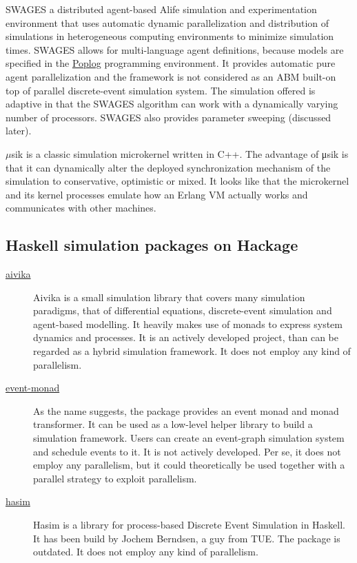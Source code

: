\documentclass[a4paper]{article}
\begin{document}
SWAGES\cite{scheutz_swages-extendable_2006} a distributed agent-based Alife simulation and experimentation environment that uses automatic
dynamic parallelization and distribution of simulations in heterogeneous computing environments to minimize simulation times. SWAGES allows for multi-language agent definitions, because models
are specified in the \href{http://en.wikipedia.org/wiki/Poplog}{Poplog} programming environment. It provides automatic pure agent parallelization and the framework is not considered as an ABM built-on top of parallel discrete-event simulation system. The simulation offered is adaptive in that the SWAGES algorithm can work with a dynamically varying number of processors. SWAGES also provides parameter sweeping (discussed later).

$\mu$sik\cite{perumalla_mu;sik_2005} is a classic simulation microkernel written in C++. The advantage of μsik is that it can dynamically alter the deployed synchronization mechanism of the simulation to conservative, optimistic or mixed. It looks like that the microkernel and its kernel processes emulate how an Erlang VM actually works and communicates with other machines.

\subsection{Haskell simulation packages on Hackage}

\begin{description}
\item[\href{http://hackage.haskell.org/package/aivika}{aivika}]
Aivika is a small simulation library that covers many simulation paradigms, that of
differential equations, discrete-event simulation and agent-based modelling.
It heavily makes use of monads to express system dynamics and processes.
It is an actively developed project, than can be regarded as a hybrid simulation framework.
It does not employ any kind of parallelism. 
\item[\href{http://hackage.haskell.org/package/event-monad}{event-monad}]
As the name suggests, the package provides an event monad and monad transformer.
It can be used as a low-level helper library to build a simulation framework.
Users can create an event-graph simulation system and schedule events to it.
It is not actively developed. Per se, it does not employ any parallelism, but it could theoretically
be used together with a parallel strategy to exploit parallelism.
\item[\href{http://hackage.haskell.org/package/hasim}{hasim}]
Hasim is a library for process-based Discrete Event Simulation in Haskell. 
It has been build by Jochem Berndsen, a guy from TUE.
The package is outdated. It does not employ any kind of parallelism. 
\end{description}
\end{document}
